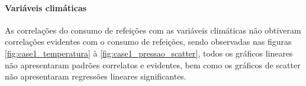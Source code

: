               \paragraph{Variáveis climáticas}
                As correlações do consumo de refeições com as variáveis climáticas não obtiveram correlações evidentes com o consumo de refeições, sendo observadas nas figuras \ref{fig:case1_temperatura} à \ref{fig:case1_pressao_scatter}, todos os gráficos lineares não apresentaram padrões correlatos e evidentes, bem como os gráficos de scatter não apresentaram regressões lineares significantes.
                
                
                {\begin{center} \begin{minipage}[c]{0.6\textwidth}\begin{figure}[H]
                    \end{figure}\end{minipage} \hfill %
                      \begin{minipage}[c]{0.3\textwidth}
                \begin{figure}[H]
                \end{figure}\end{minipage} \end{center} }
                
